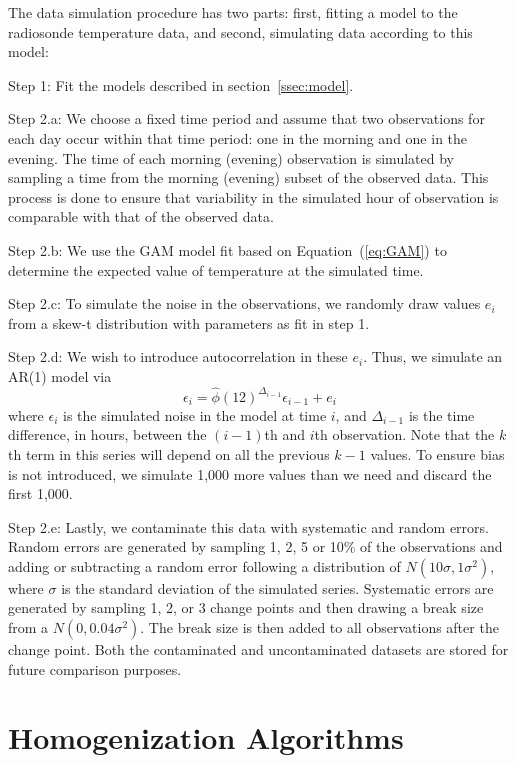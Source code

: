 \documentclass[12pt]{article}
\begin{document}
\begin{doublespacing}
The data simulation procedure has two parts: first, fitting a model to the radiosonde temperature data, and second, simulating data according to this model:

Step 1: Fit the models described in section~\ref{ssec:model}.

Step 2.a: We choose a fixed time period and assume that two observations for each day occur within that time period: one in the morning and one in the evening.  The time of each morning (evening) observation is simulated by sampling a time from the morning (evening) subset of the observed data.  This process is done to ensure that variability in the simulated hour of observation is comparable with that of the observed data.

Step 2.b: We use the GAM model fit based on Equation~(\ref{eq:GAM}) to determine the expected value of temperature at the simulated time.

Step 2.c: To simulate the noise in the observations, we randomly draw values $e_i$ from a skew-t distribution with parameters as fit in step 1.

Step 2.d: We wish to introduce autocorrelation in these $e_i$.  Thus, we simulate an AR(1) model via
\begin{equation*}
	\epsilon_i = \widehat{\phi}(12)^{\Delta_{i-1}} \epsilon_{i-1} + e_i
\end{equation*}
where $\epsilon_i$ is the simulated noise in the model at time $i$, and $\Delta_{i-1}$ is the time difference, in hours, between the $(i-1)$th and $i$th observation.  Note that the $k$th term in this series will depend on all the previous $k-1$ values.  To ensure bias is not introduced, we simulate 1,000 more values than we need and discard the first 1,000.

Step 2.e: Lastly, we contaminate this data with systematic and random errors.  Random errors are generated by sampling 1, 2, 5 or 10\% of the observations and adding or subtracting a random error following a distribution of $N(10\sigma,1\sigma^2)$, where $\sigma$ is the standard deviation of the simulated series.  Systematic errors are generated by sampling 1, 2, or 3 change points and then drawing a break size from a $N(0,0.04 \sigma^2)$.  The break size is then added to all observations after the change point.  Both the contaminated and uncontaminated datasets are stored for future comparison purposes.

\section{Homogenization Algorithms}


\end{doublespacing}
\end{document}
